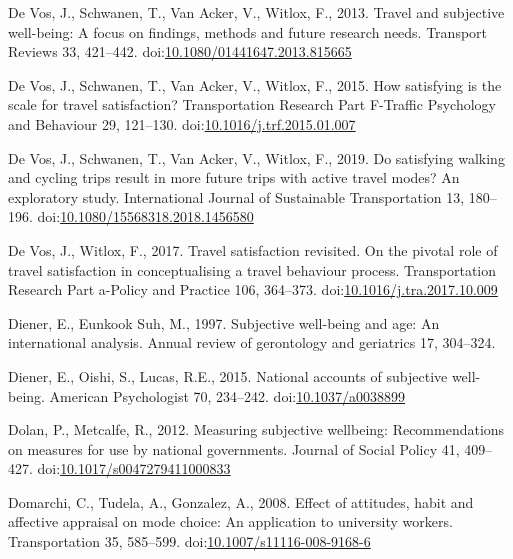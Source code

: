 \documentclass[]{elsarticle} %
\begin{document}
\leavevmode\hypertarget{ref-Devos2013travel}{}%
De Vos, J., Schwanen, T., Van Acker, V., Witlox, F., 2013. Travel and
subjective well-being: A focus on findings, methods and future research
needs. Transport Reviews 33, 421--442.
doi:\href{https://doi.org/10.1080/01441647.2013.815665}{10.1080/01441647.2013.815665}

\leavevmode\hypertarget{ref-Devos2015satisfying}{}%
De Vos, J., Schwanen, T., Van Acker, V., Witlox, F., 2015. How
satisfying is the scale for travel satisfaction? Transportation Research
Part F-Traffic Psychology and Behaviour 29, 121--130.
doi:\href{https://doi.org/10.1016/j.trf.2015.01.007}{10.1016/j.trf.2015.01.007}

\leavevmode\hypertarget{ref-Devos2019satisfying}{}%
De Vos, J., Schwanen, T., Van Acker, V., Witlox, F., 2019. Do satisfying
walking and cycling trips result in more future trips with active travel
modes? An exploratory study. International Journal of Sustainable
Transportation 13, 180--196.
doi:\href{https://doi.org/10.1080/15568318.2018.1456580}{10.1080/15568318.2018.1456580}

\leavevmode\hypertarget{ref-Devos2017travel}{}%
De Vos, J., Witlox, F., 2017. Travel satisfaction revisited. On the
pivotal role of travel satisfaction in conceptualising a travel
behaviour process. Transportation Research Part a-Policy and Practice
106, 364--373.
doi:\href{https://doi.org/10.1016/j.tra.2017.10.009}{10.1016/j.tra.2017.10.009}

\leavevmode\hypertarget{ref-Diener1997subjective}{}%
Diener, E., Eunkook Suh, M., 1997. Subjective well-being and age: An
international analysis. Annual review of gerontology and geriatrics 17,
304--324.

\leavevmode\hypertarget{ref-Diener2015national}{}%
Diener, E., Oishi, S., Lucas, R.E., 2015. National accounts of
subjective well-being. American Psychologist 70, 234--242.
doi:\href{https://doi.org/10.1037/a0038899}{10.1037/a0038899}

\leavevmode\hypertarget{ref-Dolan2012measuring}{}%
Dolan, P., Metcalfe, R., 2012. Measuring subjective wellbeing:
Recommendations on measures for use by national governments. Journal of
Social Policy 41, 409--427.
doi:\href{https://doi.org/10.1017/s0047279411000833}{10.1017/s0047279411000833}

\leavevmode\hypertarget{ref-Domarchi2008effect}{}%
Domarchi, C., Tudela, A., Gonzalez, A., 2008. Effect of attitudes, habit
and affective appraisal on mode choice: An application to university
workers. Transportation 35, 585--599.
doi:\href{https://doi.org/10.1007/s11116-008-9168-6}{10.1007/s11116-008-9168-6}
\end{document}
